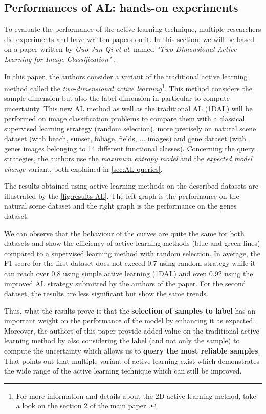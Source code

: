 \documentclass[11pt, openany]{report}
\theoremstyle{plain}
\theoremstyle{definition}
\theoremstyle{remark}
\begin{document}
\subsection{Performances of AL: hands-on experiments} \label{sec:AL-perf}
To evaluate the performance of the active learning technique, multiple researchers did experiments and have written papers on it. In this section, we will be based on a paper written by \textit{Guo-Jun Qi et al.} named \textit{"Two-Dimensional Active Learning for Image Classification"} \cite{AL-perf}.  

In this paper, the authors consider a variant of the traditional active learning method called the \textit{two-dimensional active learning}\footnote{For more information and details about the 2D active learning method, take a look on the section 2 of the main paper \cite{AL-perf}.}. This method considers the sample dimension but also the label dimension in particular to compute uncertainty. This new AL method as well as the traditional AL (1DAL) will be performed on image classification problems to compare them with a classical supervised learning strategy (random selection), more precisely on natural scene dataset (with beach, sunset, foliage, fields, ... images) and gene dataset (with genes images belonging to 14 different functional classes). Concerning the query strategies, the authors use the \textit{maximum entropy model} and the \textit{expected model change} variant, both explained in \autoref{sec:AL-queries}. 

The results obtained using active learning methods on the described datasets are illustrated by  the \autoref{fig:results-AL}. The left graph is the performance on the natural scene dataset and the right graph is the performance on the genes dataset. 

We can observe that the behaviour of the curves are quite the same for both datasets and show the efficiency of active learning methods (blue and green lines) compared to a supervised learning method with random selection. In average, the F1-score for the first dataset does not exceed 0.7 using random strategy while it can reach over 0.8 using simple active learning (1DAL) and even 0.92 using the improved AL strategy submitted by the authors of the paper. For the second dataset, the results are less significant but show the same trends. 

Thus, what the results prove is that the \textbf{selection of samples to label} has an important weight on the performance of the model by enhancing it as expected. Moreover, the authors of this paper provide added value on the traditional active learning method by also considering the label (and not only the sample) to compute the uncertainty which allows us to \textbf{query the most reliable samples}. That points out that multiple variant of active learning exist which demonstrates the wide range of the active learning technique which can still be improved.    
\end{document}
